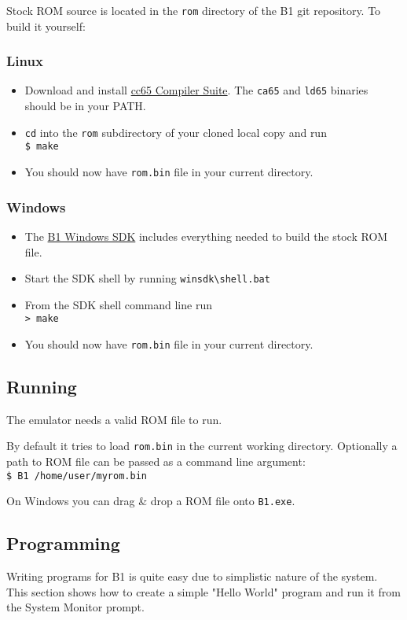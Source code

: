 \documentclass[a4paper,10pt,oneside]{article}
\begin{document}
Stock ROM source is located in the \texttt{rom} directory of the B1 git repository. To build it yourself:
\subsubsection*{Linux}
\begin{itemize}
  \item Download and install \href{http://cc65.github.io/cc65/}{cc65 Compiler Suite}. The \texttt{ca65} and \texttt{ld65} binaries should be in your PATH.
  \item \texttt{cd} into the \texttt{rom} subdirectory of your cloned local copy and run \\ \texttt{\$ make}
  \item You should now have \texttt{rom.bin} file in your current directory.
\end{itemize}

\subsubsection*{Windows}
\begin{itemize}
  \item The \href{LOL}{B1 Windows SDK} includes everything needed to build the stock ROM file.
  \item Start the SDK shell by running \texttt{winsdk\textbackslash{}shell.bat}
  \item From the SDK shell command line run \\ \texttt{> make}
  \item You should now have \texttt{rom.bin} file in your current directory.
\end{itemize}

\subsection{Running}
The emulator needs a valid ROM file to run. 

By default it tries to load \texttt{rom.bin} in the current working directory. Optionally a path to ROM file can be passed as a command line argument: \\ \texttt{\$ B1 /home/user/myrom.bin}

On Windows you can drag \& drop a ROM file onto \texttt{B1.exe}.

\subsection{Programming}
Writing programs for B1 is quite easy due to simplistic nature of the system. This section shows how to create a simple "Hello World" program and run it from the System Monitor prompt.
\end{document}
